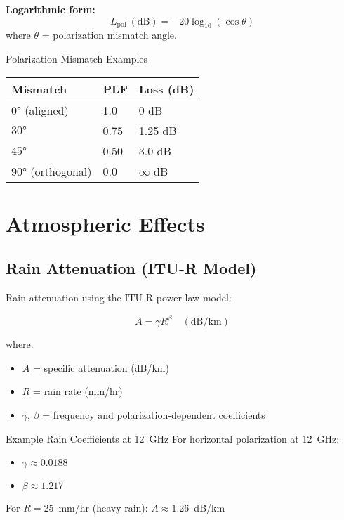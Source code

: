 \textbf{Logarithmic form:}
\begin{equation}
L_{\text{pol}}\ (\text{dB}) = -20\log_{10}(\cos\theta)
\label{eq:plf-db}
\end{equation}
where $\theta$ = polarization mismatch angle.

\begin{calloutbox}{Polarization Mismatch Examples}
\begin{tabular}{@{}lll@{}}
\toprule
Mismatch & PLF & Loss (dB) \\
\midrule
$0°$ (aligned) & 1.0 & 0 dB \\
$30°$ & 0.75 & 1.25 dB \\
$45°$ & 0.50 & 3.0 dB \\
$90°$ (orthogonal) & 0.0 & $\infty$ dB \\
\bottomrule
\end{tabular}
\end{calloutbox}

\section{Atmospheric Effects}
\label{sec:atmospheric-effects}

\subsection{Rain Attenuation (ITU-R Model)}
\label{subsec:rain-attenuation}

Rain attenuation using the ITU-R power-law model:

\begin{equation}
\label{eq:rain-attenuation}
A = \gamma R^{\beta} \quad (\text{dB/km})
\end{equation}

where:
\begin{itemize}
\item $A$ = specific attenuation (dB/km)
\item $R$ = rain rate (mm/hr)
\item $\gamma$, $\beta$ = frequency and polarization-dependent coefficients
\end{itemize}

\begin{calloutbox}{Example Rain Coefficients at 12~GHz}
For horizontal polarization at 12~GHz:
\begin{itemize}
\item $\gamma \approx 0.0188$
\item $\beta \approx 1.217$
\end{itemize}
For $R = 25$~mm/hr (heavy rain): $A \approx 1.26$~dB/km
\end{calloutbox}

